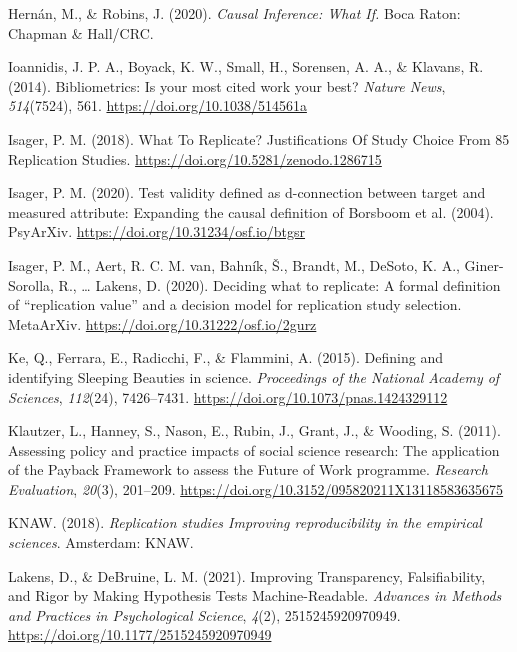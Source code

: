 \documentclass[
  english,
  jou,floatsintext]{apa6}
\newlength{\cslhangindent}
\newlength{\cslentryspacingunit} %
\newenvironment{CSLReferences}[2] %
 {%
  \setlength{\parindent}{0pt}
  \ifodd #1
  \let\oldpar\par
  \def\par{\hangindent=\cslhangindent\oldpar}
  \fi
  \setlength{\parskip}{#2\cslentryspacingunit}
 }%
 {}
\begin{document}
\begin{CSLReferences}{1}{0}
\leavevmode{}%
Hernán, M., \& Robins, J. (2020). \emph{Causal {Inference}: {What If}.} {Boca Raton}: {Chapman \& Hall/CRC}.

\leavevmode{}%
Ioannidis, J. P. A., Boyack, K. W., Small, H., Sorensen, A. A., \& Klavans, R. (2014). Bibliometrics: {Is} your most cited work your best? \emph{Nature News}, \emph{514}(7524), 561. \url{https://doi.org/10.1038/514561a}

\leavevmode{}%
Isager, P. M. (2018). What {To Replicate}? {Justifications Of Study Choice From} 85 {Replication Studies}. \url{https://doi.org/10.5281/zenodo.1286715}

\leavevmode{}%
Isager, P. M. (2020). Test validity defined as d-connection between target and measured attribute: {Expanding} the causal definition of {Borsboom} et al. (2004). {PsyArXiv}. \url{https://doi.org/10.31234/osf.io/btgsr}

\leavevmode{}%
Isager, P. M., Aert, R. C. M. van, Bahník, Š., Brandt, M., DeSoto, K. A., Giner-Sorolla, R., \ldots{} Lakens, D. (2020). Deciding what to replicate: {A} formal definition of {``replication value''} and a decision model for replication study selection. {MetaArXiv}. \url{https://doi.org/10.31222/osf.io/2gurz}

\leavevmode{}%
Ke, Q., Ferrara, E., Radicchi, F., \& Flammini, A. (2015). Defining and identifying {Sleeping Beauties} in science. \emph{Proceedings of the National Academy of Sciences}, \emph{112}(24), 7426--7431. \url{https://doi.org/10.1073/pnas.1424329112}

\leavevmode{}%
Klautzer, L., Hanney, S., Nason, E., Rubin, J., Grant, J., \& Wooding, S. (2011). Assessing policy and practice impacts of social science research: The application of the {Payback Framework} to assess the {Future} of {Work} programme. \emph{Research Evaluation}, \emph{20}(3), 201--209. \url{https://doi.org/10.3152/095820211X13118583635675}

\leavevmode{}%
KNAW. (2018). \emph{Replication studies \textendash{} {Improving} reproducibility in the empirical sciences}. {Amsterdam}: {KNAW}.

\leavevmode{}%
Lakens, D., \& DeBruine, L. M. (2021). Improving {Transparency}, {Falsifiability}, and {Rigor} by {Making Hypothesis Tests Machine}-{Readable}. \emph{Advances in Methods and Practices in Psychological Science}, \emph{4}(2), 2515245920970949. \url{https://doi.org/10.1177/2515245920970949}


\end{CSLReferences}
\end{document}
